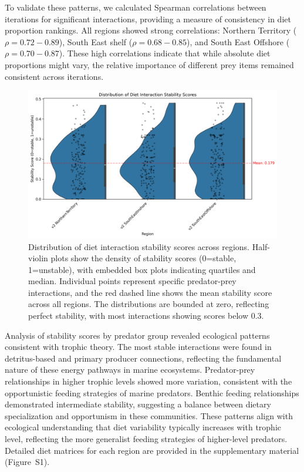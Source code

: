 To validate these patterns, we calculated Spearman correlations between iterations for significant interactions, providing a measure of consistency in diet proportion rankings. All regions showed strong correlations: Northern Territory ($\rho = 0.72-0.89$), South East shelf ($\rho = 0.68-0.85$), and South East Offshore ($\rho = 0.70-0.87$). These high correlations indicate that while absolute diet proportions might vary, the relative importance of different prey items remained consistent across iterations.

\begin{figure}[htbp]
    \centering
    \includegraphics[width=\textwidth]{figures/stability_score_distribution.png}
    \caption{Distribution of diet interaction stability scores across regions. Half-violin plots show the density of stability scores (0=stable, 1=unstable), with embedded box plots indicating quartiles and median. Individual points represent specific predator-prey interactions, and the red dashed line shows the mean stability score across all regions. The distributions are bounded at zero, reflecting perfect stability, with most interactions showing scores below 0.3.}
    \label{fig:stability_distribution}
\end{figure}

Analysis of stability scores by predator group revealed ecological patterns consistent with trophic theory. The most stable interactions were found in detritus-based and primary producer connections, reflecting the fundamental nature of these energy pathways in marine ecosystems. Predator-prey relationships in higher trophic levels showed more variation, consistent with the opportunistic feeding strategies of marine predators. Benthic feeding relationships demonstrated intermediate stability, suggesting a balance between dietary specialization and opportunism in these communities. These patterns align with ecological understanding that diet variability typically increases with trophic level, reflecting the more generalist feeding strategies of higher-level predators. Detailed diet matrices for each region are provided in the supplementary material (Figure~S1).

